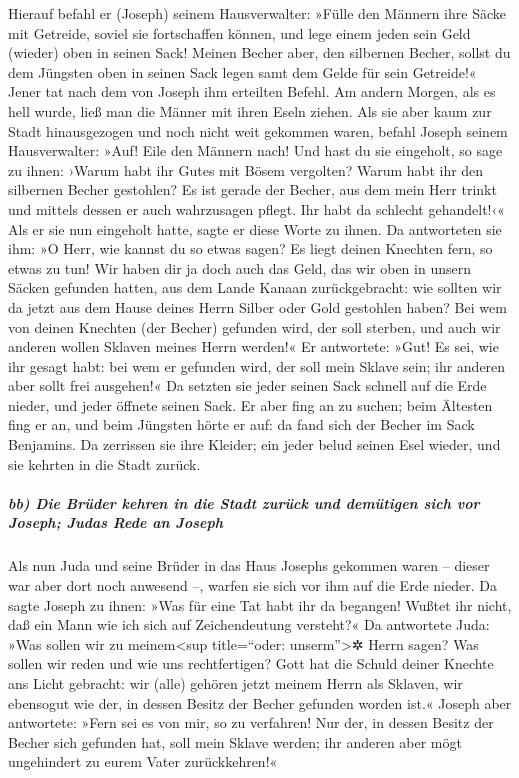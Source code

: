  Hierauf befahl er (Joseph) seinem Hausverwalter: »Fülle
den Männern ihre Säcke mit Getreide, soviel sie fortschaffen können, und
lege einem jeden sein Geld (wieder) oben in seinen Sack! 
Meinen Becher aber, den silbernen Becher, sollst du dem Jüngsten oben in
seinen Sack legen samt dem Gelde für sein Getreide!« Jener tat nach dem
von Joseph ihm erteilten Befehl.  Am andern Morgen, als es
hell wurde, ließ man die Männer mit ihren Eseln ziehen. 
Als sie aber kaum zur Stadt hinausgezogen und noch nicht weit gekommen
waren, befahl Joseph seinem Hausverwalter: »Auf! Eile den Männern nach!
Und hast du sie eingeholt, so sage zu ihnen: ›Warum habt ihr Gutes mit
Bösem vergolten?  Warum habt ihr den silbernen Becher
gestohlen? Es ist gerade der Becher, aus dem mein Herr trinkt und
mittels dessen er auch wahrzusagen pflegt. Ihr habt da schlecht
gehandelt!‹«  Als er sie nun eingeholt hatte, sagte er
diese Worte zu ihnen.  Da antworteten sie ihm: »O Herr,
wie kannst du so etwas sagen? Es liegt deinen Knechten fern, so etwas zu
tun!  Wir haben dir ja doch auch das Geld, das wir oben in
unsern Säcken gefunden hatten, aus dem Lande Kanaan zurückgebracht: wie
sollten wir da jetzt aus dem Hause deines Herrn Silber oder Gold
gestohlen haben?  Bei wem von deinen Knechten (der Becher)
gefunden wird, der soll sterben, und auch wir anderen wollen Sklaven
meines Herrn werden!«  Er antwortete: »Gut! Es sei, wie
ihr gesagt habt: bei wem er gefunden wird, der soll mein Sklave sein;
ihr anderen aber sollt frei ausgehen!«  Da setzten sie
jeder seinen Sack schnell auf die Erde nieder, und jeder öffnete seinen
Sack.  Er aber fing an zu suchen; beim Ältesten fing er
an, und beim Jüngsten hörte er auf: da fand sich der Becher im Sack
Benjamins.  Da zerrissen sie ihre Kleider; ein jeder
belud seinen Esel wieder, und sie kehrten in die Stadt zurück.

\hypertarget{bb-die-bruxfcder-kehren-in-die-stadt-zuruxfcck-und-demuxfctigen-sich-vor-joseph-judas-rede-an-joseph}{%
\subparagraph{bb) Die Brüder kehren in die Stadt zurück und demütigen
sich vor Joseph; Judas Rede an
Joseph}\label{bb-die-bruxfcder-kehren-in-die-stadt-zuruxfcck-und-demuxfctigen-sich-vor-joseph-judas-rede-an-joseph}}

 Als nun Juda und seine Brüder in das Haus Josephs
gekommen waren -- dieser war aber dort noch anwesend --, warfen sie sich
vor ihm auf die Erde nieder.  Da sagte Joseph zu ihnen:
»Was für eine Tat habt ihr da begangen! Wußtet ihr nicht, daß ein Mann
wie ich sich auf Zeichendeutung versteht?«  Da antwortete
Juda: »Was sollen wir zu meinem\textless sup title=``oder:
unserm''\textgreater✲ Herrn sagen? Was sollen wir reden und wie uns
rechtfertigen? Gott hat die Schuld deiner Knechte ans Licht gebracht:
wir (alle) gehören jetzt meinem Herrn als Sklaven, wir ebensogut wie
der, in dessen Besitz der Becher gefunden worden ist.« 
Joseph aber antwortete: »Fern sei es von mir, so zu verfahren! Nur der,
in dessen Besitz der Becher sich gefunden hat, soll mein Sklave werden;
ihr anderen aber mögt ungehindert zu eurem Vater zurückkehren!«


